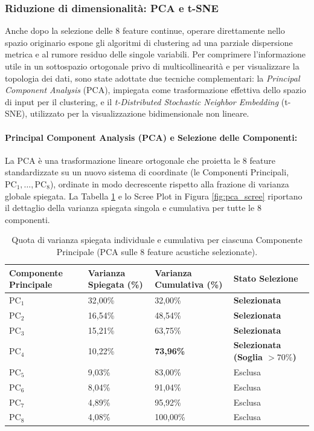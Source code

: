 \subsubsection{Riduzione di dimensionalità: PCA e t-SNE}

Anche dopo la selezione delle 8 feature continue, operare direttamente nello spazio originario espone gli algoritmi di clustering ad una parziale dispersione metrica e al rumore residuo delle singole variabili. Per comprimere l'informazione utile in un sottospazio ortogonale privo di multicollinearità e per visualizzare la topologia dei dati, sono state adottate due tecniche complementari: la \textit{Principal Component Analysis} (PCA), impiegata come trasformazione effettiva dello spazio di input per il clustering, e il \textit{t-Distributed Stochastic Neighbor Embedding} (t-SNE), utilizzato per la visualizzazione bidimensionale non lineare.

\paragraph{Principal Component Analysis (PCA) e Selezione delle Componenti:}
La PCA è una trasformazione lineare ortogonale che proietta le 8 feature standardizzate su un nuovo sistema di coordinate (le Componenti Principali, $\text{PC}_1, \dots, \text{PC}_8$), ordinate in modo decrescente rispetto alla frazione di varianza globale spiegata. La Tabella \ref{tab:pca_variance} e lo Scree Plot in Figura \ref{fig:pca_scree} riportano il dettaglio della varianza spiegata singola e cumulativa per tutte le 8 componenti.

\begin{table}[H]
\centering
\caption{Quota di varianza spiegata individuale e cumulativa per ciascuna Componente Principale (PCA sulle 8 feature acustiche selezionate).}
\label{tab:pca_variance}
\vspace{0.2cm}
\begin{tabularx}{\textwidth}{lXXX}
\toprule
\textbf{Componente Principale} & \textbf{Varianza Spiegata (\%)} & \textbf{Varianza Cumulativa (\%)} & \textbf{Stato Selezione} \\
\midrule
$\text{PC}_1$ & 32,00\% & 32,00\% & \textbf{Selezionata} \\
$\text{PC}_2$ & 16,54\% & 48,54\% & \textbf{Selezionata} \\
$\text{PC}_3$ & 15,21\% & 63,75\% & \textbf{Selezionata} \\
$\text{PC}_4$ & 10,22\% & \textbf{73,96\%} & \textbf{Selezionata (Soglia $>70\%$)} \\
\midrule
$\text{PC}_5$ & 9,03\% & 83,00\% & Esclusa \\
$\text{PC}_6$ & 8,04\% & 91,04\% & Esclusa \\
$\text{PC}_7$ & 4,89\% & 95,92\% & Esclusa \\
$\text{PC}_8$ & 4,08\% & 100,00\% & Esclusa \\
\bottomrule
\end{tabularx}
\end{table}


